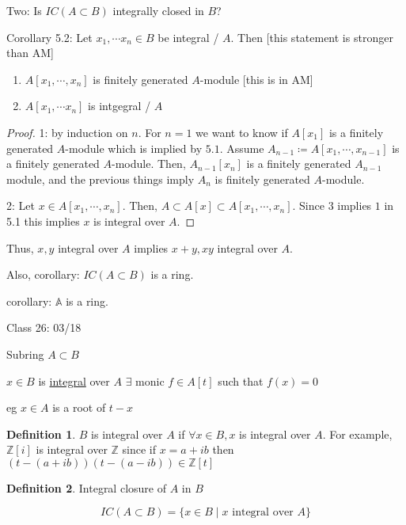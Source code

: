 \documentclass{article}
\theoremstyle{definition}
\newtheorem{definition}{Definition}
\begin{document}
Two: Is \(IC(A \subset B)\) integrally closed in \(B\)?

Corollary 5.2: Let \(x_1,\cdots x_n\in B\) be integral / \(A\). Then [this statement is stronger than AM]

\begin{enumerate}
    \item \(A[x_1,\cdots, x_n]\) is finitely generated \(A\)-module [this is in AM]
    \item \(A[x_1,\cdots x_n]\) is intgegral / \(A\)
\end{enumerate}

\begin{proof}
    1: by induction on \(n\). For \(n = 1\) we want to know if \(A[x_1]\) is a finitely generated \(A\)-module which is implied by \(5.1\). Assume \(A_{n-1} \coloneqq A[x_1,\cdots, x_{n-1}]\) is a finitely generated \(A\)-module. Then, \(A_{n-1}[x_n]\) is a finitely generated \(A_{n-1}\) module, and the previous things imply \(A_n\) is finitely generated \(A\)-module.
    
    2: Let \(x\in A[x_1,\cdots,x_n]\). Then, \(A \subset A[x] \subset A[x_1,\cdots, x_n]\). Since \(3\) implies \(1\) in 5.1 this implies \(x\) is integral over \(A\).
\end{proof}

Thus, \(x,y\) integral over \(A\) implies \(x+y,xy\) integral over \(A\).

Also, corollary: \(IC (A \subset B)\) is a ring.

corollary: \(\mathbb{A}\) is a ring.

\hrulefill

Class 26: 03/18

Subring \(A \subset B\) 

\(x \in B\) is \underline{integral} over \(A\) \(\exists\) monic \(f\in A[t]\) such that \(f(x)=0\) 

eg \(x\in A\) is a root of \(t - x\) 

\begin{definition}
    \(B\) is integral over \(A\) if \(\forall x\in B, x\) is integral over \(A\). For example, \(\mathbb{Z} [i]\) is integral over \(\mathbb{Z}\) since if \(x=a+ib\) then \((t-(a+ib))(t-(a-ib))\in\mathbb{Z} [t]\)     
\end{definition}

\begin{definition}
    Integral closure of \(A\) in \(B\) 

    \[
        IC (A \subset B) = \{ x\in B\mid x \text{ integral over } A \} 
    \]
\end{definition}
\end{document}
